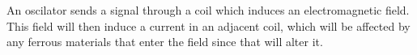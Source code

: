 
% 

An oscilator sends a signal through a coil which induces an electromagnetic field. This field will then induce a current in an adjacent coil,
which will be affected by any ferrous materials that enter the field since that will alter it. 